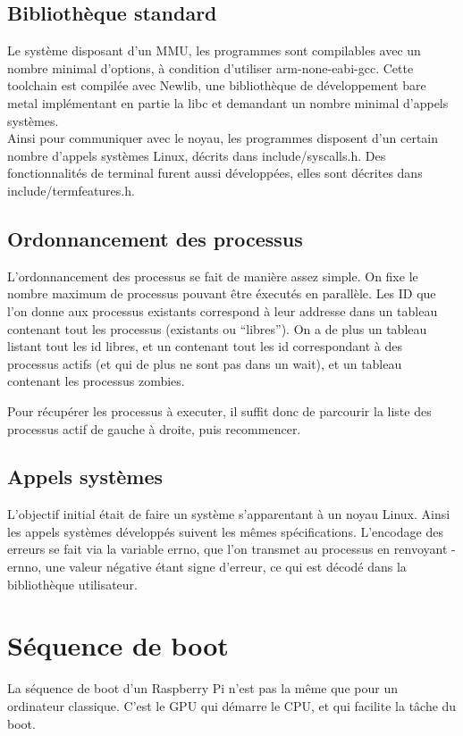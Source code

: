 \documentclass[a4paper]{article}
\begin{document}
\subsection{Bibliothèque standard}
Le système disposant d'un MMU, les programmes sont compilables avec un nombre
minimal d'options, à condition d'utiliser arm-none-eabi-gcc. Cette toolchain
est compilée avec Newlib, une bibliothèque de développement bare metal
implémentant en partie la libc et demandant un nombre minimal d'appels systèmes. \\
Ainsi pour communiquer avec le noyau, les programmes disposent d'un certain
nombre d'appels systèmes Linux, décrits dans include/syscalls.h.
Des fonctionnalités de terminal furent aussi développées, elles sont décrites
dans include/termfeatures.h.

\subsection{Ordonnancement des processus}

L'ordonnancement des processus se fait de manière assez simple. On fixe le
nombre maximum de processus pouvant être éxecutés en parallèle. Les ID que l'on
donne aux processus existants correspond à leur addresse dans un tableau
contenant tout les processus (existants ou ``libres''). On a de plus un tableau
listant tout les id libres, et un contenant tout les id correspondant à des
processus actifs (et qui de plus ne sont pas dans un wait), et un tableau
contenant les processus zombies.

Pour récupérer les processus à executer, il suffit donc de parcourir la liste
des processus actif de gauche à droite, puis recommencer.

\subsection{Appels systèmes}
L'objectif initial était de faire un système s'apparentant à un noyau Linux.
Ainsi les appels systèmes développés suivent les mêmes spécifications.
L'encodage des erreurs se fait via la variable errno, que l'on transmet au
processus en renvoyant -ernno, une valeur négative étant signe d'erreur, ce qui
est décodé dans la bibliothèque utilisateur.

\section{Séquence de boot}

La séquence de boot d'un Raspberry Pi n'est pas la même que pour un ordinateur
classique. C'est le GPU qui démarre le CPU, et qui facilite la tâche du boot.
\end{document}
